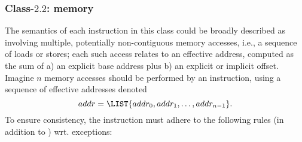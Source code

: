 




\subsubsection{Class-$2.2$: memory}
\label{sec:spec:instruction:2:2}

The semantics of each instruction in this class could be broadly described 
as involving multiple, potentially non-contiguous memory accesses, i.e., a 
sequence of loads or stores; each such access relates to an effective
address, computed as the sum of 
a) an explicit             base address 
   plus
b) an explicit or implicit offset.
Imagine $n$ memory accesses should be performed by an instruction, using a 
sequence of effective addresses denoted
\[
addr = \LIST{ addr_0, addr_1, \ldots, addr_{n-1} } .
\]
To ensure consistency, the instruction must adhere to the following rules 
(in addition to ) wrt. exceptions:

